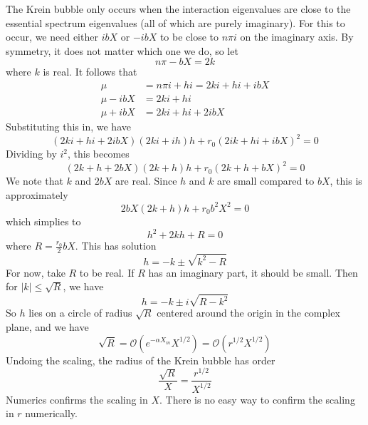 \documentclass[thesis.tex]{subfiles}
\begin{document}
The Krein bubble only occurs when the interaction eigenvalues are close to the essential spectrum eigenvalues (all of which are purely imaginary). For this to occur, we need either $i b X$ or $-i b X$ to be close to $n \pi i$ on the imaginary axis. By symmetry, it does not matter which one we do, so let
\[
n \pi - b X = 2 k
\]
where $k$ is real. It follows that
\begin{align*}
\mu &= n \pi i + h i = 2 k i + h i + i b X \\
\mu - i b X &= 2 k i + h i\\
\mu + i b X &= 2 k i + h i + 2 i b X
\end{align*}
Substituting this in, we have
\[
(2 k i + h i + 2i bX)(2k i + i h) h + r_0 (2 i k + h i + i b X)^2 = 0
\]
Dividing by $i^2$, this becomes
\[
(2 k + h + 2bX)(2k + h) h + r_0 (2 k + h + b X)^2 = 0
\]
We note that $k$ and $2bX$ are real. Since $h$ and $k$ are small compared to $b X$, this is approximately
\[
2bX(2k + h) h + r_0 b^2 X^2 = 0
\]
which simplies to
\[
h^2 + 2kh + R  = 0
\]
where $R = \frac{r_0}{2} b X$. This has solution
\[
h = -k \pm \sqrt{k^2 - R}
\]
For now, take $R$ to be real. If $R$ has an imaginary part, it should be small. Then for $|k| \leq \sqrt{R}$, we have
\[
h = -k \pm i \sqrt{R - k^2}
\]
So $h$ lies on a circle of radius $\sqrt{R}$ centered around the origin in the complex plane, and we have
\[
\sqrt{R} = \mathcal{O}(e^{-\alpha X_m}X^{1/2}) = \mathcal{O}(r^{1/2} X^{1/2})
\]
Undoing the scaling, the radius of the Krein bubble has order
\[
\frac{\sqrt{R}}{X} = \frac{r^{1/2}}{X^{1/2}}
\] 
Numerics confirms the scaling in $X$. There is no easy way to confirm the scaling in $r$ numerically.
\end{document}
